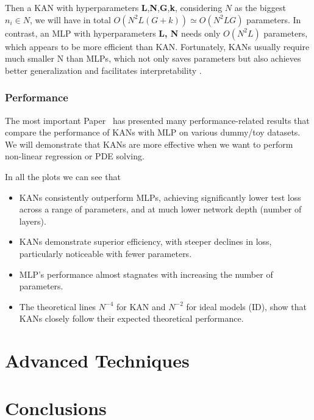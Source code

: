 \documentclass[12pt,a4paper]{article}
\begin{document}
Then a KAN with hyperparameters \textbf{L},\textbf{N},\textbf{G},\textbf{k}, considering $N$ as the biggest $n_i \in N$, we will have in total $O(N^2L(G + k))  \simeq O(N^2LG)$ parameters. In contrast, an MLP with hyperparameters \textbf{L, N} needs only  $O(N^2L)$ parameters, which appears to be more efficient than KAN. Fortunately, KANs usually require much smaller N than MLPs, which not only saves parameters but also achieves better generalization and facilitates interpretability \cite{KAN}. 

\subsubsection{Performance}
The most important Paper~\cite{KAN} has presented many performance-related results that compare the performance of KANs with MLP on various dummy/toy datasets. We will demonstrate that KANs are more effective when we want to perform non-linear regression or PDE solving.

In all the plots we can see that
\begin{itemize}
    \item KANs consistently outperform MLPs, achieving significantly lower test loss across a range of parameters, and at much lower network depth (number of layers).
    \item KANs demonstrate superior efficiency, with steeper declines in loss, particularly noticeable with fewer parameters.
    \item MLP's performance almost stagnates with increasing the number of parameters.
    \item The theoretical lines $N^{-4}$ for KAN and $N^{-2}$ for ideal models (ID), show that KANs closely follow their expected theoretical performance.
\end{itemize}

\section{Advanced Techniques}
\section{Conclusions}


\end{document}
